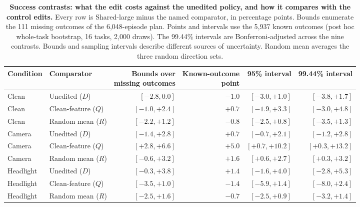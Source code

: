 \begin{table}[t]
\caption{\textbf{Success contrasts: what the edit costs against the unedited policy, and how it compares with the control edits.} Every row is Shared-large minus the named comparator, in percentage points. Bounds enumerate the 111 missing outcomes of the 6,048-episode plan. Points and intervals use the 5,937 known outcomes (post hoc whole-task bootstrap, 16 tasks, 2,000 draws). The 99.44\% intervals are Bonferroni-adjusted across the nine contrasts. Bounds and sampling intervals describe different sources of uncertainty. Random mean averages the three random direction sets.}
\centering\small
\setlength{\tabcolsep}{5pt}
\begin{tabular}{llrrrr}\toprule
Condition & Comparator & \shortstack{Bounds over\\missing outcomes} & \shortstack{Known-outcome\\point} & 95\% interval & 99.44\% interval\\\midrule
Clean & Unedited ($D$) & $[-2.8,0.0]$ & $-1.0$ & $[-3.0,+1.0]$ & $[-3.8,+1.7]$\\
Clean & Clean-feature ($Q$) & $[-1.0,+2.4]$ & $+0.7$ & $[-1.9,+3.3]$ & $[-3.0,+4.8]$\\
Clean & Random mean ($R$) & $[-2.2,+1.2]$ & $-0.8$ & $[-2.5,+0.8]$ & $[-3.5,+1.3]$\\
\midrule
Camera & Unedited ($D$) & $[-1.4,+2.8]$ & $+0.7$ & $[-0.7,+2.1]$ & $[-1.2,+2.8]$\\
Camera & Clean-feature ($Q$) & $[+2.8,+6.6]$ & $+5.0$ & $[+0.7,+10.2]$ & $[+0.3,+13.2]$\\
Camera & Random mean ($R$) & $[-0.6,+3.2]$ & $+1.6$ & $[+0.6,+2.7]$ & $[+0.3,+3.2]$\\
\midrule
Headlight & Unedited ($D$) & $[-0.3,+3.8]$ & $+1.4$ & $[-1.6,+4.0]$ & $[-2.8,+5.3]$\\
Headlight & Clean-feature ($Q$) & $[-3.5,+1.0]$ & $-1.4$ & $[-5.9,+1.4]$ & $[-8.0,+2.4]$\\
Headlight & Random mean ($R$) & $[-2.5,+1.6]$ & $-0.7$ & $[-2.5,+0.9]$ & $[-3.2,+1.4]$\\
\bottomrule\end{tabular}

\label{tab:supp-native-contrasts}
\end{table}
